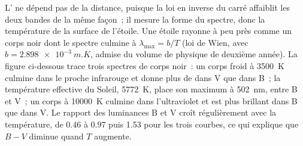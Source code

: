 L' ne dépend pas de la distance, puisque la loi en inverse du
carré affaiblit les deux bandes de la même façon~; il mesure la forme du
spectre, donc la température de la surface de l'étoile. Une étoile rayonne à
peu près comme un corps noir dont le spectre culmine à
$\lambda_\mathrm{max} = b/T$ (loi de Wien, avec
$b = \qty{2.898e-3}{m.K}$, admise du volume de physique de deuxième année).
La figure ci-dessous trace trois spectres de corps noir~: un
corps froid à \qty{3500}{K} culmine dans le proche infrarouge et donne plus de
 dans V que dans B~; la température effective du Soleil, \qty{5772}{K}, place
son maximum à \qty{502}{nm}, entre B et V~; un corps à \qty{10000}{K} culmine
dans l'ultraviolet et est plus brillant dans B que dans V. Le rapport des
luminances B et V croît régulièrement avec la température, de \num{0.46} à
\num{0.97} puis \num{1.53} pour les trois courbes, ce qui explique que $B - V$
diminue quand $T$ augmente.

